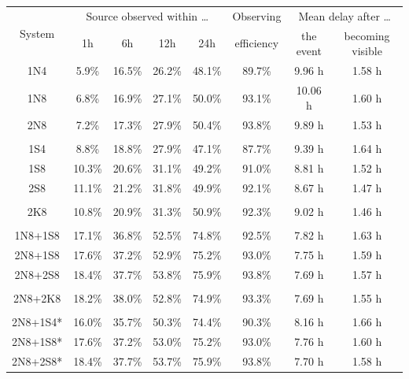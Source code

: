 \begin{colsection}
\begin{table}[p]
    \begin{center}
        \begin{tabular}{c|cccc|c|cc} %
            \multirow{2}{*}{System} &
            \multicolumn{4}{c|}{Source observed within \ldots} &
            {\small Observing} &
            \multicolumn{2}{c}{Mean delay after \ldots} \\
                & 1h & 6h & 12h & 24h & efficiency & {\small the event} & {\small becoming visible} \\
            \midrule
                 1N4 &  5.9\% & 16.5\% & 26.2\% & 48.1\% & 89.7\% &  9.96 h & 1.58 h \\
                 1N8 &  6.8\% & 16.9\% & 27.1\% & 50.0\% & 93.1\% & 10.06 h & 1.60 h \\
                 2N8 &  7.2\% & 17.3\% & 27.9\% & 50.4\% & 93.8\% &  9.89 h & 1.53 h \\
            &&&&&&&\\
                 1S4 &  8.8\% & 18.8\% & 27.9\% & 47.1\% & 87.7\% &  9.39 h & 1.64 h \\
                 1S8 & 10.3\% & 20.6\% & 31.1\% & 49.2\% & 91.0\% &  8.81 h & 1.52 h \\
                 2S8 & 11.1\% & 21.2\% & 31.8\% & 49.9\% & 92.1\% &  8.67 h & 1.47 h \\
            &&&&&&&\\
                 2K8 & 10.8\% & 20.9\% & 31.3\% & 50.9\% & 92.3\% &  9.02 h & 1.46 h \\
            &&&&&&&\\
             1N8+1S8 & 17.1\% & 36.8\% & 52.5\% & 74.8\% & 92.5\% &  7.82 h & 1.63 h \\
             2N8+1S8 & 17.6\% & 37.2\% & 52.9\% & 75.2\% & 93.0\% &  7.75 h & 1.59 h \\
             2N8+2S8 & 18.4\% & 37.7\% & 53.8\% & 75.9\% & 93.8\% &  7.69 h & 1.57 h \\
            &&&&&&&\\
            2N8+2K8  & 18.2\% & 38.0\% & 52.8\% & 74.9\% & 93.3\% &  7.69 h & 1.55 h \\
            &&&&&&&\\
            2N8+1S4* & 16.0\% & 35.7\% & 50.3\% & 74.4\% & 90.3\% &  8.16 h & 1.66 h \\
            2N8+1S8* & 17.6\% & 37.2\% & 53.0\% & 75.2\% & 93.0\% &  7.76 h & 1.60 h \\
            2N8+2S8* & 18.4\% & 37.7\% & 53.7\% & 75.9\% & 93.8\% &  7.70 h & 1.58 h \\

\end{tabular}
\end{center}
\end{table}
\end{colsection}
